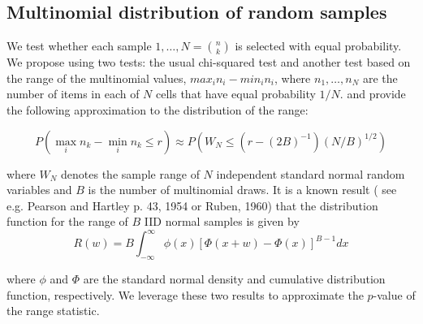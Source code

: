 \documentclass[12pt]{article}
\newcommand{\todo}[1]{{\color{red}{TO DO: \sc #1}}}
\begin{document}
\subsection{Multinomial distribution of random samples}

We test whether each sample $1, \dots, N = {n \choose k}$ is selected with equal probability. 
We propose using two tests: the usual chi-squared test and another test based on the range of the multinomial values, $max_i n_i - min_i n_i$, where $n_1, \dots, n_N$ are the number of items in each of $N$ cells that have equal probability $1/N$.
\citet{johnson_applications_1960} and \citet{young_two_1962} provide the following approximation to the distribution of the range:

$$P(\max_i n_k - \min_i n_k \leq r) \approx P(W_N \leq (r-(2B)^{-1})(N/B)^{1/2})$$

\noindent where $W_N$ denotes the sample range of $N$ independent standard normal random variables and $B$ is the number of multinomial draws. 
It is a known result (\todo{} see e.g. Pearson and Hartley p. 43, 1954 or Ruben, 1960) that the distribution function for the range of $B$ IID normal samples is given by
$$R(w) = B \int_{-\infty}^{\infty} \phi(x)\left[ \Phi(x+w) - \Phi(x)\right]^{B-1}dx$$

\noindent where $\phi$ and $\Phi$ are the standard normal density and cumulative distribution function, respectively. 
We leverage these two results to approximate the $p$-value of the range statistic.
\end{document}
